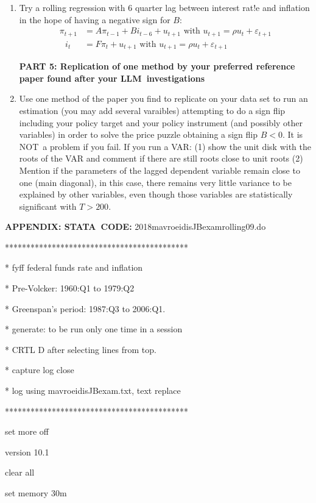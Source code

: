 \documentclass[12pt,a4paper]{article}%
\begin{document}
\begin{enumerate}
\item Try a rolling regression with 6 quarter lag between interest rat!e and
inflation in the hope of having a negative sign for $B$:%
\begin{align*}
\pi_{t+1} &  =A\pi_{t-1}+Bi_{t-6}+u_{t+1}\text{ with }u_{t+1}=\rho
u_{t}+\varepsilon_{t+1}\\
\text{ }i_{t} &  =F\pi_{t}+u_{t+1}\text{ with }u_{t+1}=\rho u_{t}%
+\varepsilon_{t+1}%
\end{align*}


\textbf{PART 5: Replication of one method by your preferred  reference paper
found after your LLM\ investigations}

\item Use one method of the paper you find to replicate on your data set to
run an estimation (you may add several varaibles) attempting to do a sign flip
including your policy target and your policy instrument (and possibly other
variables) in order to solve the price puzzle obtaining a sign flip $B<0$. It
is NOT\ a problem if you fail. If you run a VAR: (1) show the unit disk with
the roots of the VAR and comment if there are still roots close to unit roots
(2) Mention if the parameters of the lagged dependent variable remain close to
one (main diagonal), in this case, there remains very little variance to be
explained by other variables, even though those variables are statistically
significant with $T>200$.
\end{enumerate}

\textbf{APPENDIX: STATA\ CODE: }2018mavroeidisJBexamrolling09.do

*******************************************

* fyff federal funds rate and inflation

* Pre-Volcker: 1960:Q1 to 1979:Q2

* Greenspan's period: 1987:Q3 to 2006:Q1.

* generate: to be run only one time in a session

* CRTL D after selecting lines from top.

* capture log close

* log using mavroeidisJBexam.txt, text replace

*******************************************

set more off

version 10.1

clear all

set memory 30m
\end{document}
